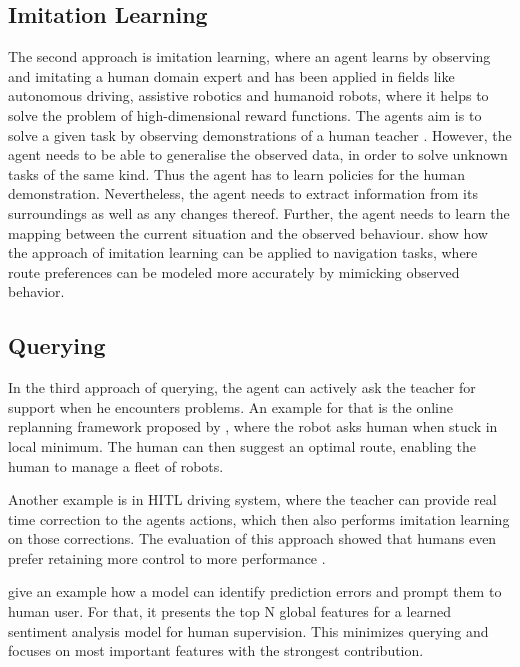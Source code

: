 \documentclass[twoside,11pt]{article}
\begin{document}
\subsection{Imitation Learning}

The second approach is imitation learning, where an agent learns by observing and imitating a human domain expert and has been applied in fields like autonomous driving, assistive robotics and humanoid robots, where it helps to solve the problem of high-dimensional reward functions. The agents aim is to solve a given task by observing demonstrations of a human teacher \cite{HusseinEtAl:2017:ImitationLearning}. However, the agent needs to be able to generalise the observed data, in order to solve unknown tasks of the same kind. Thus the agent has to learn policies for the human demonstration. Nevertheless, the agent needs to extract information from its surroundings as well as any changes thereof. Further, the agent needs to learn the mapping between the current situation and the observed behaviour. \cite{ZiebartEtAl:2008:ImitationLearningNavigation} show how the approach of imitation learning can be applied to navigation tasks, where route preferences can be modeled more accurately by mimicking observed behavior.

\subsection{Querying}

In the third approach of querying, the agent can actively ask the teacher for support when he encounters problems.
An example for that is the online replanning framework proposed by \cite{PapallasEtAl:2020:OnlineReplanningTrajectories}, where the robot asks human when stuck in local minimum. The human can then suggest an optimal route, enabling the human to manage a fleet of robots.

Another example is in HITL driving system, where the teacher can provide real time correction to the agents actions, which then also performs imitation learning on those corrections. The evaluation of this approach showed that humans even prefer retaining more control to more performance \cite{WuEtAl:2021:HITLDRLAutonomousDriving}.

\cite{LiuGuoMahmud:2021:HITLErrorDetectionFramework} give an example how a model can identify prediction errors and prompt them to human user. For that, it presents the top N global features for a learned sentiment analysis model for human supervision. This minimizes querying and focuses on most important features with the strongest contribution.
\end{document}
